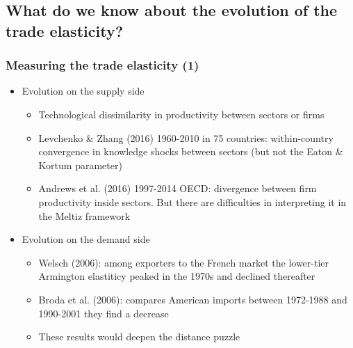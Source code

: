 \documentclass{beamer}
\begin{document}
\subsection{What do we know about the evolution of the trade elasticity?}

\begin{frame}\frametitle{Measuring the trade elasticity (1)}

\begin{itemize}
\item Evolution on the supply side
	\begin{itemize}
	\item Technological dissimilarity in productivity between sectors or firms
	\item Levchenko \& Zhang (2016) 1960-2010 in 75 countries: within-country convergence in knowledge shocks between sectors (but not the Eaton \& Kortum parameter)
	\item Andrews et al. (2016) 1997-2014 OECD: divergence between firm productivity inside sectors. But there are difficulties in interpreting it in the Meltiz framework
	\end{itemize}
\item Evolution on the demand side
	\begin{itemize}
	\item Welsch (2006): among exporters to the French market the lower-tier Armington elastiticy peaked in the 1970s and declined thereafter
	\item Broda et al. (2006): compares American imports between 1972-1988 and 1990-2001 they find a decrease
	\item These results would deepen the distance puzzle
	\end{itemize}
\end{itemize}
\end{frame}	
\end{document}
